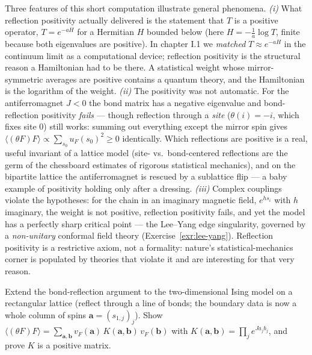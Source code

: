 \begin{eexample}
Three features of this short computation illustrate general phenomena.
\emph{(i)} What reflection positivity actually delivered is the statement that
$T$ is a positive operator, $T = e^{-aH}$ for a Hermitian $H$ bounded below
(here $H = -\frac1a \log T$, finite because both eigenvalues are positive). In
chapter I.1 we \emph{matched} $T \approx e^{-aH}$ in the continuum limit as a
computational device; reflection positivity is the structural reason a
Hamiltonian had to be there. A statistical weight whose mirror-symmetric
averages are positive contains a quantum theory, and the Hamiltonian is the
logarithm of the weight.
\emph{(ii)} The positivity was not automatic. For the antiferromagnet $J < 0$
the bond matrix has a negative eigenvalue and bond-reflection positivity
\emph{fails} --- though reflection through a \emph{site} ($\theta(i) = -i$,
which fixes site $0$) still works: summing out everything except the mirror
spin gives $\langle(\theta F) F\rangle \propto \sum_{s_0} u_F(s_0)^2 \ge 0$
identically. Which reflections are positive is a real, useful invariant of a
lattice model (site- vs.\ bond-centered reflections are the germ of the
chessboard estimates of rigorous statistical mechanics), and on the bipartite
lattice the antiferromagnet is rescued by a sublattice flip --- a baby example
of positivity holding only after a dressing.
\emph{(iii)} Complex couplings violate the hypotheses: for the chain in an imaginary
magnetic field, $e^{h s_i}$ with $h$ imaginary, the weight is not positive,
reflection positivity fails, and yet the model has a perfectly sharp critical
point --- the Lee--Yang edge singularity, governed by a \emph{non-unitary}
conformal field theory (Exercise~\ref{exr:lee-yang}). Reflection positivity is
a restrictive axiom, not a formality: nature's statistical-mechanics corner is
populated by theories that violate it and are interesting for that very reason.
\end{eexample}

\begin{exercise}[easy]
\label{exr:rp-2d-ising}
Extend the bond-reflection argument to the two-dimensional Ising model on a
rectangular lattice (reflect through a line of bonds; the boundary data is now
a whole column of spins $\mathbf{a} = (s_{1,j})_j$). Show $\langle (\theta F) F
\rangle = \sum_{\mathbf{a}, \mathbf{b}} v_F(\mathbf{a})\, K(\mathbf{a}, \mathbf{b})\, v_F(\mathbf{b})$
with $K(\mathbf{a}, \mathbf{b}) = \prod_j e^{J a_j b_j}$, and prove $K$ is a positive
matrix.
\end{exercise}

